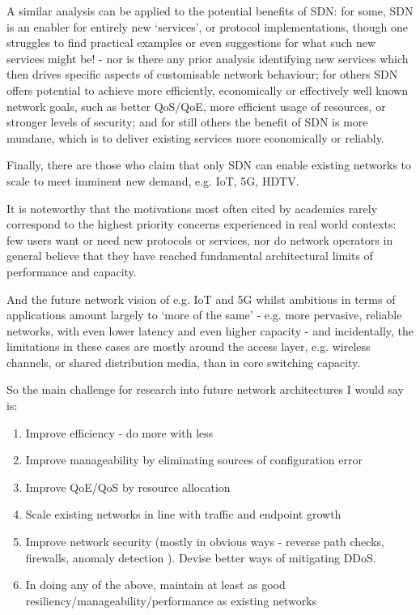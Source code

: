 A similar analysis can be applied to the potential benefits of SDN: for some, SDN is an enabler for entirely new ‘services’, or protocol implementations, though one struggles to find practical examples or even suggestions for what such new services might be! - nor is there any prior analysis identifying new services which then drives specific aspects of customisable network behaviour; for others SDN offers potential to achieve more efficiently, economically or effectively well known network goals, such as better QoS/QoE, more efficient usage of resources, or stronger levels of security; and for still others the benefit of SDN is more mundane, which is to deliver existing services more economically or reliably.

Finally, there are those who claim that only SDN can enable existing networks to scale to meet imminent new demand, e.g. IoT, 5G, HDTV.

It is noteworthy that the motivations most often cited by academics rarely correspond to the highest priority concerns experienced in real world contexts: few users want or need new protocols or services, nor do network operators in general believe that they have reached fundamental architectural limits of performance and capacity.

And the future network vision of e.g. IoT and 5G whilst ambitious in terms of applications amount largely to ‘more of the same’ - e.g. more pervasive, reliable networks, with even lower latency and even higher capacity - and incidentally, the limitations in these cases are mostly around the access layer, e.g. wireless channels, or shared distribution media, than in core switching capacity.

So the main challenge for research into future network architectures I would say is:

\begin{enumerate}
	\item Improve efficiency - do more with less
	\item Improve manageability by eliminating sources of configuration error
	\item Improve QoE/QoS by resource allocation
	\item Scale existing networks in line with traffic and endpoint growth
	\item Improve network security (mostly in obvious ways - reverse path checks, firewalls, anomaly detection ).
	      Devise better ways of mitigating DDoS.
	\item In doing any of the above, maintain at least as good resiliency/manageability/performance as existing networks
\end{enumerate}

